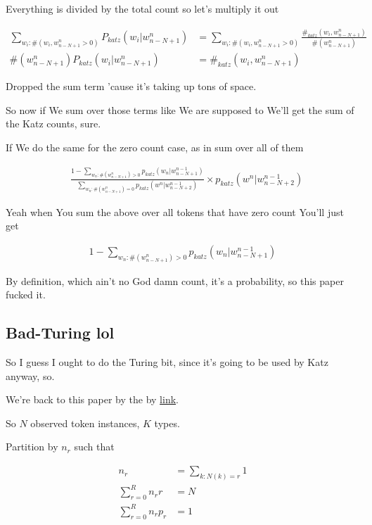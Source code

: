 \documentclass{article}
\begin{document}
		Everything is divided by the total count so let's multiply it out 
		
		\begin{align}
			\sum_{w_i:\#(w_i, w^n_{n-N+1}>0)}P_{katz}(w_i|w^n_{n-N+1}) &= \sum_{w_i:\#(w_i, w^n_{n-N+1}>0)}\frac{\#_{katz}(w_i, w^n_{n-N+1})}{\#(w^n_{n-N+1})}\\
			\#(w^n_{n-N+1})P_{katz}(w_i|w^n_{n-N+1}) &= \#_{katz}(w_i, w^n_{n-N+1})
		\end{align}
		
		Dropped the sum term 'cause it's taking up tons of space.
		
		So now if We sum over those terms like We are supposed to We'll get the sum of the Katz counts, sure.
		
		If We do the same for the zero count case, as in sum over all of them
		
		\begin{align}
			&\frac{1 - \sum_{w_n:\#(w^n_{n-N+1})>0} p_{katz}(w_n|w^{n-1}_{n-N+1})}{\sum_{w_n:\#(w^n_{n-N+1})=0} p_{katz}(w^n|w^{n-1}_{n-N+2})} \times p_{katz}(w^n|w^{n-1}_{n-N+2})
		\end{align}
		
		Yeah when You sum the above over all tokens that have zero count You'll just get 
		
		\begin{align}
			1 - \sum_{w_n:\#(w^n_{n-N+1})>0} p_{katz}(w_n|w^{n-1}_{n-N+1})
		\end{align}
		
		By definition, which ain't no God damn count, it's a probability, so this paper fucked it.
		
	\subsection{Bad-Turing lol}
	
		So I guess I ought to do the Turing bit, since it's going to be used by Katz anyway, so.
		
		We're back to this paper by the by \href{https://ieeexplore.ieee.org/stamp/stamp.jsp?arnumber=476512&tag=1}{link}.
		
		So $N$ observed token instances, $K$ types.
		
		Partition by $n_r$ such that
		
		\begin{align}
			n_r &= \sum_{k:N(k)=r} 1\\
			\sum^{R}_{r=0} n_r  r &= N\\
			\sum^R_{r=0} n_r p_r &= 1
		\end{align}
		
\end{document}
